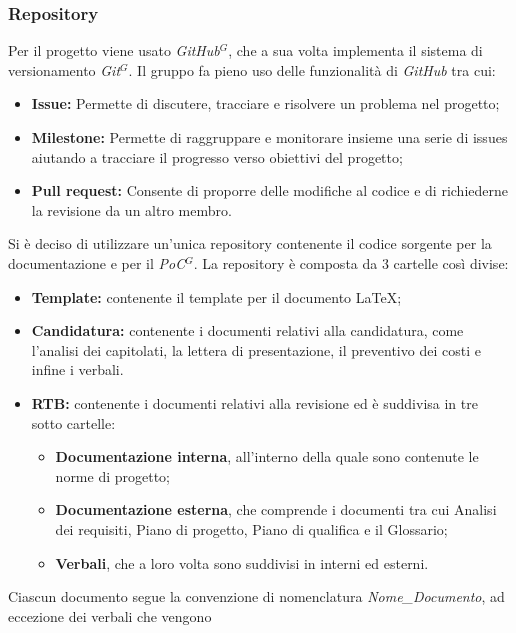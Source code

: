 \subsubsection{Repository}
    Per il progetto viene usato \emph{GitHub}$^{G}$, che a sua volta implementa il sistema di versionamento 
    \emph{Git}$^{G}$. Il gruppo fa pieno uso delle funzionalità di \emph{GitHub} tra cui:
    \begin{itemize}
        \item \textbf{Issue:} Permette di discutere, tracciare e risolvere un problema nel progetto;
        \item \textbf{Milestone:} Permette di raggruppare e monitorare insieme una serie di issues aiutando a tracciare il progresso verso obiettivi del progetto;
        \item \textbf{Pull request:} Consente di proporre delle modifiche al codice e di richiederne la revisione da un altro membro.
    \end{itemize}
    Si è deciso di utilizzare un'unica repository contenente il codice sorgente per la documentazione e per il \emph{PoC}$^{G}$.
    La repository è composta da 3 cartelle così divise:
    \begin{itemize}
        \item \textbf{Template:} contenente il template per il documento \LaTeX;
        \item \textbf{Candidatura:} contenente i documenti relativi alla candidatura, come l'analisi dei capitolati,
        la lettera di presentazione, il preventivo dei costi e infine i verbali.
        \item \textbf{RTB:} contenente i documenti relativi alla revisione ed è suddivisa in tre sotto cartelle:
        \begin{itemize}
            \item \textbf{Documentazione interna}, all'interno della quale sono contenute le norme di progetto;
            \item \textbf{Documentazione esterna}, che comprende i documenti tra cui Analisi dei requisiti, Piano di progetto, Piano di qualifica e il Glossario;
            \item \textbf{Verbali}, che a loro volta sono suddivisi in interni ed esterni.
        \end{itemize}
    \end{itemize}
    Ciascun documento segue la convenzione di nomenclatura \emph{Nome\_Documento}, ad eccezione dei verbali che vengono 
